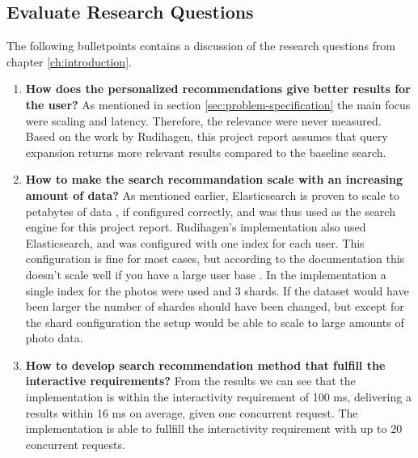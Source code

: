 \subsection{Evaluate Research Questions}
The following bulletpoints contains a discussion of the research questions from chapter \ref{ch:introduction}.

\begin{enumerate}
  \item \textbf{How does the personalized recommendations give better results for the user?} \newline
  As mentioned in section \ref{sec:problem-specification} the main focus were scaling and latency.
  Therefore, the relevance were never measured.
  Based on the work by Rudihagen,
  this project report assumes that query expansion returns more relevant results compared to the baseline search.

  \item\label{rq:scaling} \textbf{How to make the search recommandation scale with an increasing amount of data?} \newline
  As mentioned earlier, Elasticsearch is proven to scale to petabytes of data \cite{elasticsearch-scale},
  if configured correctly, and was thus used as the search engine for this project report.
  Rudihagen's implementation also used Elasticsearch, and was configured with one index for each user.
  This configuration is fine for most cases, but according to the documentation this doesn't scale well if you have a large user base \cite{elasticsearch-indices}.
  In the implementation a single index for the photos were used and 3 shards.
  If the dataset would have been larger the number of shardes should have been changed,
  but except for the shard configuration the setup would be able to scale to large amounts of photo data.

  \item\label{rq:latency} \textbf{How to develop search recommendation method that fulfill the interactive requirements?} \newline
  From the results we can see that the implementation is within the interactivity requirement of 100 ms, delivering a results within 16 ms on average, given one concurrent request.
  The implementation is able to fullfill the interactivity requirement with up to 20 concurrent requests.
\end{enumerate}
